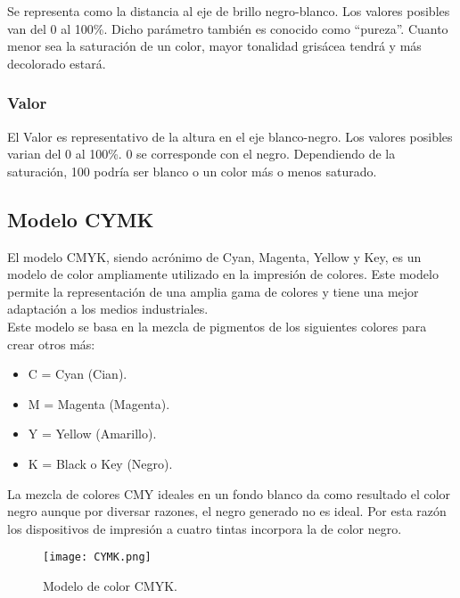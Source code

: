 Se representa como la distancia al eje de brillo negro-blanco. Los valores posibles van del 0 al 100\%. Dicho parámetro también es conocido como ``pureza''. Cuanto menor sea la saturación de un color, mayor tonalidad grisácea tendrá y más decolorado estará.

\subsubsection{Valor}

El Valor es representativo de la altura en el eje blanco-negro. Los valores posibles varian del 0 al 100\%. 0 se corresponde con el negro. Dependiendo de la saturación, 100 podría ser blanco o un color más o menos saturado.

\subsection{Modelo CYMK}

El modelo CMYK, siendo acrónimo de Cyan, Magenta, Yellow y Key, es un modelo de color ampliamente utilizado en la impresión  de colores. Este modelo permite la representación de una amplia gama de colores y tiene una mejor adaptación a los medios industriales.\\

Este modelo se basa en la mezcla de pigmentos de los siguientes colores para crear otros más:\\

\begin{itemize}
\item C = Cyan (Cian).
\item M = Magenta (Magenta).
\item Y = Yellow (Amarillo).
\item K = Black o Key (Negro).
\end{itemize}

La mezcla de colores CMY ideales en un fondo blanco da como resultado el color negro aunque por diversar razones, el negro generado no es ideal. Por esta razón los dispositivos de impresión a cuatro tintas incorpora la de color negro.\\

\begin{figure}[H]
  \begin{center}
    \texttt{[image: CYMK.png]}
  \end{center}
  \caption{Modelo de color CMYK.}
  \label{modelo-RGB}
\end{figure}
